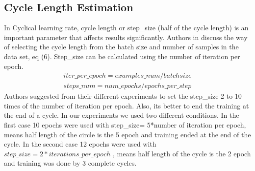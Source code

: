 \documentclass[journal, a4paper]{IEEEtran}
\begin{document}
\subsection{Cycle Length Estimation}
In Cyclical learning rate, cycle length or step\_size (half of the cycle length) is an important parameter that affects results significantly. Authors in \cite{CLR} discuss the way of selecting the cycle length from the batch size and number of samples in the data set, eq (6). Step\_size can be calculated using the number of iteration per epoch. 
\begin{eqnarray}
iter\_per\_epoch = examples\_num / batchsize \\
steps\_num = num\_epochs / epochs\_per\_step
\end{eqnarray}
Authors suggested from their different experiments to set the step\_size 2 to 10 times of the number of iteration per epoch. Also, its better to end the training at the end of a cycle.
In our experiments we used two different conditions. In the first case 10 epochs were used with step\_size= 5*number of iteration per epoch, means half length of the circle is the 5 epoch and training ended at the end of the cycle. In the second case 12 epochs were used with $step\_size= 2 * iterations\_per\_epoch$ , means half length of the cycle is the 2 epoch and training was done by 3 complete cycles.
\end{document}
